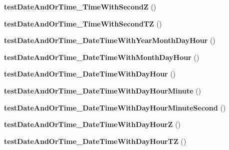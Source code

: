 \begin{DoxyCompactItemize}
{\bfseries test\+Date\+And\+Or\+Time\+\_\+\+Time\+With\+SecondZ} ()
\item 
\mbox{\label{class_sabre_1_1_v_object_1_1_date_time_parser_test_afb3eb179e85d6f54dcb60640fbf88309}} 
{\bfseries test\+Date\+And\+Or\+Time\+\_\+\+Time\+With\+Second\+TZ} ()
\item 
\mbox{\label{class_sabre_1_1_v_object_1_1_date_time_parser_test_a0bd38eb0cb540c75cb4cbe07cb5962ea}} 
{\bfseries test\+Date\+And\+Or\+Time\+\_\+\+Date\+Time\+With\+Year\+Month\+Day\+Hour} ()
\item 
\mbox{\label{class_sabre_1_1_v_object_1_1_date_time_parser_test_a558cc6cfeebddee9853eaecc0bb8e459}} 
{\bfseries test\+Date\+And\+Or\+Time\+\_\+\+Date\+Time\+With\+Month\+Day\+Hour} ()
\item 
\mbox{\label{class_sabre_1_1_v_object_1_1_date_time_parser_test_ae0f915e0b57a0ebaaa284ae768d37744}} 
{\bfseries test\+Date\+And\+Or\+Time\+\_\+\+Date\+Time\+With\+Day\+Hour} ()
\item 
\mbox{\label{class_sabre_1_1_v_object_1_1_date_time_parser_test_aed46f602be9d610fe89f0430132dae59}} 
{\bfseries test\+Date\+And\+Or\+Time\+\_\+\+Date\+Time\+With\+Day\+Hour\+Minute} ()
\item 
\mbox{\label{class_sabre_1_1_v_object_1_1_date_time_parser_test_a42404f44f33d576cdf177b0767e515bb}} 
{\bfseries test\+Date\+And\+Or\+Time\+\_\+\+Date\+Time\+With\+Day\+Hour\+Minute\+Second} ()
\item 
\mbox{\label{class_sabre_1_1_v_object_1_1_date_time_parser_test_a5e4c998c194de2a7a63eda510bb4b7c7}} 
{\bfseries test\+Date\+And\+Or\+Time\+\_\+\+Date\+Time\+With\+Day\+HourZ} ()
\item 
\mbox{\label{class_sabre_1_1_v_object_1_1_date_time_parser_test_a63ffd72b71d6cfa09e6f21f660b793ea}} 
{\bfseries test\+Date\+And\+Or\+Time\+\_\+\+Date\+Time\+With\+Day\+Hour\+TZ} ()
\end{DoxyCompactItemize}
